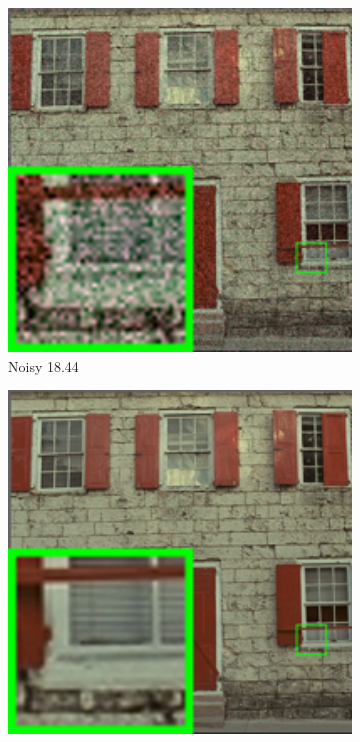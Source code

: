\begin{figure}
    \centering
    \begin{subfigure}[t]{0.19\textwidth}
        \centering
        \includegraphics[width=1\textwidth]{images/mcwnnm/24images/resize_br_Noisy_nSig402030_kodim01.png}
		\caption{Noisy 18.44}
    \end{subfigure}
    \hfill
    \begin{subfigure}[t]{0.19\textwidth}
        \centering
        \includegraphics[width=1\textwidth]{images/mcwnnm/24images/resize_br_kodim01.png}

\end{subfigure}
\end{figure}
